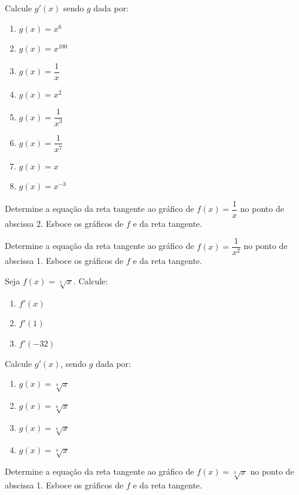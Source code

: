 \begin{exercicio}[2]
Calcule $g'(x)$ sendo $g$ dada por:
\begin{enumerate}[label=\alph*)]
    \item $g(x) = x^6$
    \item $g(x) = x^{100}$
    \item $g(x) = \dfrac{1}{x}$
    \item $g(x) = x^2$
    \item $g(x) = \dfrac{1}{x^3}$
    \item $g(x) = \dfrac{1}{x^7}$
    \item $g(x) = x$
    \item $g(x) = x^{-3}$
\end{enumerate}
\end{exercicio}

\begin{exercicio}[3]
Determine a equação da reta tangente ao gráfico de $f(x) = \dfrac{1}{x}$ no ponto de abscissa 2. Esboce os gráficos de $f$ e da reta tangente.
\end{exercicio}

\begin{exercicio}[4]
Determine a equação da reta tangente ao gráfico de $f(x) = \dfrac{1}{x^2}$ no ponto de abscissa 1. Esboce os gráficos de $f$ e da reta tangente.
\end{exercicio}

\begin{exercicio}[5]
Seja $f(x) = \sqrt[5]{x}$. Calcule:
\begin{enumerate}[label=\alph*)]
    \item $f'(x)$
    \item $f'(1)$
    \item $f'(-32)$
\end{enumerate}
\end{exercicio}

\begin{exercicio}[6]
Calcule $g'(x)$, sendo $g$ dada por:
\begin{enumerate}[label=\alph*)]
    \item $g(x) = \sqrt[4]{x}$
    \item $g(x) = \sqrt[6]{x}$
    \item $g(x) = \sqrt[8]{x}$
    \item $g(x) = \sqrt[9]{x}$
\end{enumerate}
\end{exercicio}

\begin{exercicio}[7]
Determine a equação da reta tangente ao gráfico de $f(x) = \sqrt[3]{x}$ no ponto de abscissa 1. Esboce os gráficos de $f$ e da reta tangente.
\end{exercicio}

